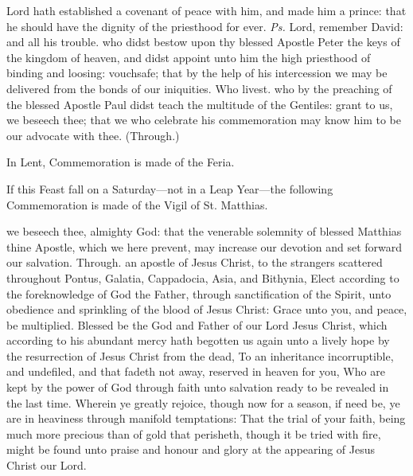 \introit
{} Lord hath established a covenant of peace with him, and made him a prince: that he should have the dignity of the priesthood for ever. \textit{Ps.} Lord, remember David: and all his trouble.
\collect
{} who didst bestow upon thy blessed Apostle Peter the keys of the kingdom of heaven, and didst appoint unto him the high priesthood of binding and loosing: vouchsafe; that by the help of his intercession we may be delivered from the bonds of our iniquities. Who livest.
 who by the preaching of the blessed Apostle Paul didst teach the multitude of the Gentiles: grant to us, we beseech thee; that we who celebrate his commemoration may know him to be our advocate with thee. (Through.)
\begin{rubric}
    In Lent, Commemoration is made of the Feria.%
\end{rubric}
\begin{rubric}
    If this Feast fall on a Saturday---not in a Leap Year---the following Commemoration is made of the Vigil of St. Matthias.
\end{rubric}
 we beseech thee, almighty God: that the venerable solemnity of blessed Matthias thine Apostle, which we here prevent, may increase our devotion and set forward our salvation. Through.
 an apostle of Jesus Christ, to the strangers scattered throughout Pontus, Galatia, Cappadocia, Asia, and Bithynia, Elect according to the foreknowledge of God the Father, through sanctification of the Spirit, unto obedience and sprinkling of the blood of Jesus Christ: Grace unto you, and peace, be multiplied. Blessed be the God and Father of our Lord Jesus Christ, which according to his abundant mercy hath begotten us again unto a lively hope by the resurrection of Jesus Christ from the dead, To an inheritance incorruptible, and undefiled, and that fadeth not away, reserved in heaven for you, Who are kept by the power of God through faith unto salvation ready to be revealed in the last time. Wherein ye greatly rejoice, though now for a season, if need be, ye are in heaviness through manifold temptations: That the trial of your faith, being much more precious than of gold that perisheth, though it be tried with fire, might be found unto praise and honour and glory at the appearing of Jesus Christ our Lord.

